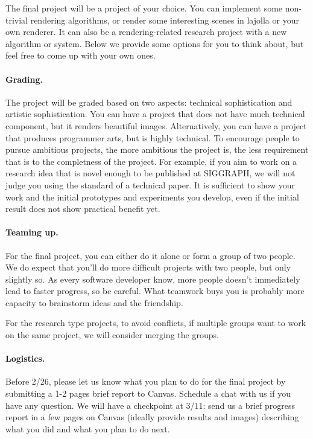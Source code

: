 




The final project will be a project of your choice. You can implement some non-trivial rendering algorithms, or render some interesting scenes in lajolla or your own renderer. It can also be a rendering-related research project with a new algorithm or system. 
Below we provide some options for you to think about, but feel free to come up with your own ones.

\paragraph{Grading.} 
The project will be graded based on two aspects: technical sophistication and artistic sophistication.
You can have a project that does not have much technical component, but it renders beautiful images.
Alternatively, you can have a project that produces programmer arts, but is highly technical. 
To encourage people to pursue ambitious projects, the more ambitious the project is, the less requirement that is to the completness of the project. 
For example, if you aim to work on a research idea that is novel enough to be published at SIGGRAPH, we will not judge you using the standard of a technical paper.
It is sufficient to show your work and the initial prototypes and experiments you develop, even if the initial result does not show practical benefit yet.

\paragraph{Teaming up.}
For the final project, you can either do it alone or form a group of two people. We do expect that you'll do more difficult projects with two people, but only slightly so. As every software developer know, more people doesn't immediately lead to faster progress, so be careful. What teamwork buys you is probably more capacity to brainstorm ideas and the friendship.

For the research type projects, to avoid conflicts, if multiple groups want to work on the same project, we will consider merging the groups. 

\paragraph{Logistics.}
Before 2/26, please let us know what you plan to do for the final project by submitting a 1-2 pages brief report to Canvas.
Schedule a chat with us if you have any question. 
We will have a checkpoint at 3/11: send us a brief progress report in a few pages on Canvas (ideally provide results and images) describing what you did and what you plan to do next.

